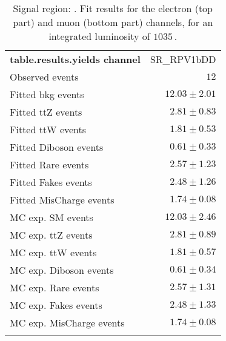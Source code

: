 

\begin{table}
\begin{center}
\setlength{\tabcolsep}{0.0pc}
{\small
\begin{tabular*}{\textwidth}{@{\extracolsep{\fill}}lr}
\noalign{\smallskip}\hline\noalign{\smallskip}
{\bf table.results.yields channel}           & SR\_RPV1bDD              \\[-0.05cm]
\noalign{\smallskip}\hline\noalign{\smallskip}
Observed events          & $12$                    \\
\noalign{\smallskip}\hline\noalign{\smallskip}
Fitted bkg events         & $12.03 \pm 2.01$              \\
\noalign{\smallskip}\hline\noalign{\smallskip}
        Fitted ttZ events         & $2.81 \pm 0.83$              \\
        Fitted ttW events         & $1.81 \pm 0.53$              \\
        Fitted Diboson events         & $0.61 \pm 0.33$              \\
        Fitted Rare events         & $2.57 \pm 1.23$              \\
        Fitted Fakes events         & $2.48 \pm 1.26$              \\
        Fitted MisCharge events         & $1.74 \pm 0.08$              \\
 \noalign{\smallskip}\hline\noalign{\smallskip}
MC exp. SM events              & $12.03 \pm 2.46$              \\
\noalign{\smallskip}\hline\noalign{\smallskip}
        MC exp. ttZ events         & $2.81 \pm 0.89$              \\
        MC exp. ttW events         & $1.81 \pm 0.57$              \\
        MC exp. Diboson events         & $0.61 \pm 0.34$              \\
        MC exp. Rare events         & $2.57 \pm 1.31$              \\
        MC exp. Fakes events         & $2.48 \pm 1.33$              \\
        MC exp. MisCharge events         & $1.74 \pm 0.08$              \\
\noalign{\smallskip}\hline\noalign{\smallskip}
\end{tabular*}
}
\end{center}
\caption{Signal region: . Fit results for the electron (top part) and muon (bottom part) channels, for an integrated luminosity of $1035$\,\ipb.
}
\end{table}
